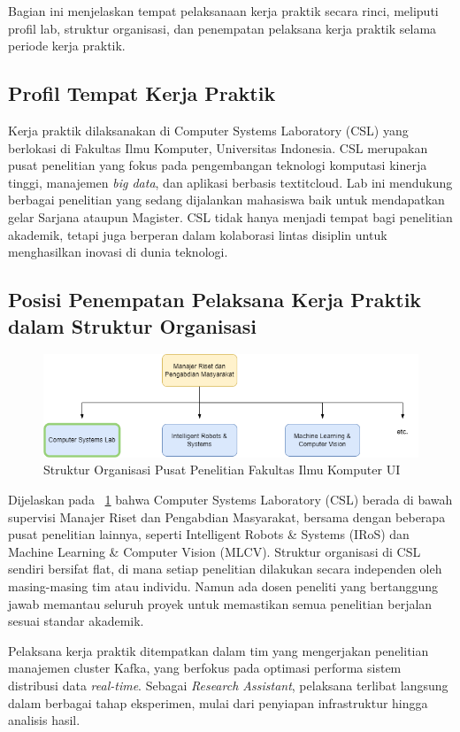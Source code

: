 Bagian ini menjelaskan tempat pelaksanaan kerja praktik secara rinci, meliputi profil lab, struktur organisasi, dan penempatan pelaksana kerja praktik selama periode kerja praktik.

\subsection{Profil Tempat Kerja Praktik}

Kerja praktik dilaksanakan di Computer Systems Laboratory (CSL) yang berlokasi di Fakultas Ilmu Komputer, Universitas Indonesia. CSL merupakan pusat penelitian yang fokus pada pengembangan teknologi komputasi kinerja tinggi, manajemen \textit{big data}, dan aplikasi berbasis textit{cloud}. Lab ini mendukung berbagai penelitian yang sedang dijalankan mahasiswa baik untuk mendapatkan gelar Sarjana ataupun Magister. CSL tidak hanya menjadi tempat bagi penelitian akademik, tetapi juga berperan dalam kolaborasi lintas disiplin untuk menghasilkan inovasi di dunia teknologi.

\subsection{Posisi Penempatan Pelaksana Kerja Praktik dalam Struktur Organisasi}

\vspace*{0.8cm}

\begin{figure}
	\centering
	\includegraphics[width=1\textwidth]
	{assets/pics/pacil-org.png}
	\caption{Struktur Organisasi Pusat Penelitian Fakultas Ilmu Komputer UI}
	\label{fig:pacil-org}
\end{figure}

Dijelaskan pada \pic~\ref{fig:pacil-org} bahwa Computer Systems Laboratory (CSL) berada di bawah supervisi Manajer Riset dan Pengabdian Masyarakat, bersama dengan beberapa pusat penelitian lainnya, seperti Intelligent Robots \& Systems (IRoS) dan Machine Learning \& Computer Vision (MLCV). Struktur organisasi di CSL sendiri bersifat flat, di mana setiap penelitian dilakukan secara independen oleh masing-masing tim atau individu. Namun ada dosen peneliti yang bertanggung jawab memantau seluruh proyek untuk memastikan semua penelitian berjalan sesuai standar akademik.

Pelaksana kerja praktik ditempatkan dalam tim yang mengerjakan penelitian manajemen cluster Kafka, yang berfokus pada optimasi performa sistem distribusi data \textit{real-time}. Sebagai \textit{Research Assistant}, pelaksana terlibat langsung dalam berbagai tahap eksperimen, mulai dari penyiapan infrastruktur hingga analisis hasil.
